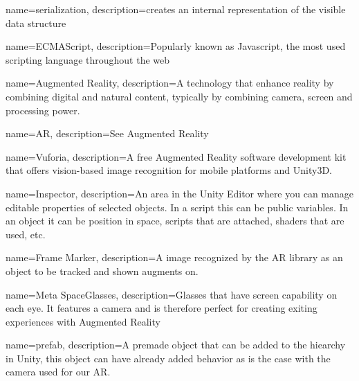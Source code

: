 {
	name=serialization,
	description={creates an internal representation of the visible data 
  				structure}
}

{
	name=ECMAScript,
	description={Popularly known as Javascript, the most used scripting
				language throughout the web}
}

{
	name=Augmented Reality,
	description={A technology that enhance reality by combining digital and
				natural content, typically by combining camera, screen and
				processing power.}
}

{
	name=AR,
	description={See \gls{Augmented Reality}}
}

{
	name=Vuforia,
	description={A free Augmented Reality software development kit that	offers
				vision-based image recognition for mobile platforms	and 
				Unity3D.}
}

{
	name=Inspector,
	description={An area in the Unity Editor where you can manage editable
	properties of selected objects. In a script this can be public
	variables. In an object it can be position in space, scripts that are 
	attached, shaders that are used, etc.}
}

{
	name=Frame Marker,
	description={A image recognized by the AR library as an object to be tracked and shown augments on.}
}

{
	name=Meta SpaceGlasses,
	description={Glasses that have screen capability on each eye. It features a camera and is therefore perfect for creating exiting experiences with \gls{Augmented Reality}}
}

{
	name=prefab,
	description={A premade object that can be added to the hiearchy in Unity, this object can have already added behavior as is the case with the camera used for our \gls{AR}.}
}
